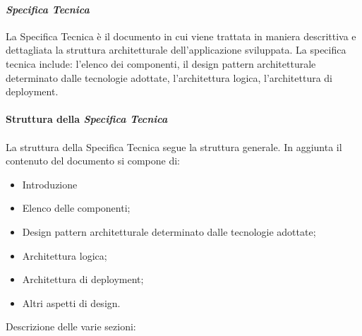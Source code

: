 \paragraph{\textit{Specifica Tecnica}}
La Specifica Tecnica è il documento in cui viene trattata in maniera descrittiva e dettagliata la struttura architetturale dell'applicazione sviluppata. 
La specifica tecnica include: l'elenco dei componenti, il design pattern architetturale determinato dalle tecnologie adottate, l'architettura logica, l'architettura di deployment.
\\\\
\textbf{Struttura della \textit{Specifica Tecnica}}
\\\\
La struttura della Specifica Tecnica segue la struttura generale.
In aggiunta il contenuto del documento si compone di:
\begin{itemize}
	\item Introduzione
    \item Elenco delle componenti;
    \item Design pattern architetturale determinato dalle tecnologie adottate;
    \item Architettura logica;
	\item Architettura di deployment;
	\item Altri aspetti di design.
\end{itemize}
\noindent Descrizione delle varie sezioni:
